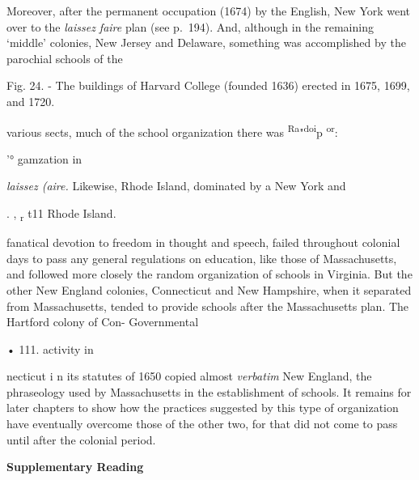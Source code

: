 \documentclass[
]{book}
\begin{document}
Moreover, after the permanent occupation (1674) by the English, New York went over to the \emph{laissez faire} plan (see p.~194). And, although in the remaining `middle' colonies, New Jersey and Delaware, something was accomplished by the parochial schools of the

Fig. 24. - The buildings of Harvard College (founded 1636) erected in 1675, 1699, and 1720.

various sects, much of the school organization there was \textsuperscript{Ra}"\textsuperscript{doi}p \textsuperscript{or}:

'° gamzation in

\emph{laissez (aire.} Likewise, Rhode Island, dominated by a New York and

. , \textsubscript{r} t11 Rhode Island.

fanatical devotion to freedom in thought and speech, failed throughout colonial days to pass any general regulations on education, like those of Massachusetts, and followed more closely the random organization of schools in Virginia. But the other New England colonies, Connecticut and New Hampshire, when it separated from Massachusetts, tended to provide schools after the Massachusetts plan. The Hartford colony of Con- Governmental

• 111. activity in

necticut i n its statutes of 1650 copied almost \emph{verbatim} New England, the phraseology used by Massachusetts in the establishment of schools. It remains for later chapters to show how the practices suggested by this type of organization have eventually overcome those of the other two, for that did not come to pass until after the colonial period.

\textbf{Supplementary Reading}
\end{document}
